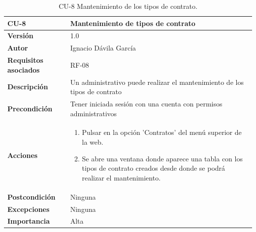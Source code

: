 \begin{table}[p]
	\centering
	\begin{tabularx}{\linewidth}{ p{} p{} }
		\toprule
		\textbf{CU-8}    & \textbf{Mantenimiento de tipos de contrato}\\
		\toprule
		\textbf{Versión}              & 1.0    \\
		\textbf{Autor}                & Ignacio Dávila García \\
		\textbf{Requisitos asociados} & RF-08 \\
		\textbf{Descripción}          & Un administrativo puede realizar el mantenimiento de los tipos de contrato \\
		\textbf{Precondición}         & Tener iniciada sesión con una cuenta con permisos administrativos \\
		\textbf{Acciones}             &
		\begin{enumerate}
			\def\labelenumi{\arabic{enumi}.}
			\tightlist
			\item Pulsar en la opción 'Contratos' del menú superior de la web.
			\item Se abre una ventana donde aparece una tabla con los tipos de contrato creados desde donde se podrá realizar el mantenimiento.
		\end{enumerate}\\
		\textbf{Postcondición}        & Ninguna \\
		\textbf{Excepciones}          & Ninguna \\
		\textbf{Importancia}          & Alta \\
		\bottomrule
	\end{tabularx}
	\caption{CU-8 Mantenimiento de los tipos de contrato.}
\end{table}

